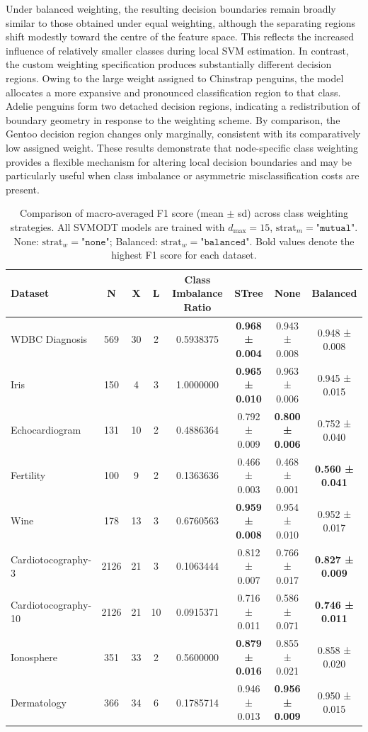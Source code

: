 Under balanced weighting, the resulting decision boundaries remain broadly similar to those obtained under equal weighting, although the separating regions shift modestly toward the centre of the feature space. This reflects the increased influence of relatively smaller classes during local SVM estimation. In contrast, the custom weighting specification produces substantially different decision regions. Owing to the large weight assigned to Chinstrap penguins, the model allocates a more expansive and pronounced classification region to that class. Adelie penguins form two detached decision regions, indicating a redistribution of boundary geometry in response to the weighting scheme. By comparison, the Gentoo decision region changes only marginally, consistent with its comparatively low assigned weight. These results demonstrate that node-specific class weighting provides a flexible mechanism for altering local decision boundaries and may be particularly useful when class imbalance or asymmetric misclassification costs are present.

\begin{table}
\centering
\caption{\label{tab:svmodt-class-weight-f1-score-table-latex}Comparison of macro-averaged F1 score (mean \(\pm\) sd) across class weighting strategies. All SVMODT models are trained with \(d_{\max}=15\), \(\mathrm{strat}_{m}=\texttt{"mutual"}\). None: \(\mathrm{strat}_{w}=\texttt{"none"}\); Balanced: \(\mathrm{strat}_{w}=\texttt{"balanced"}\). Bold values denote the highest F1 score for each dataset.}
\centering
\fontsize{8}{10}\selectfont
\begin{tabular}[t]{l|c|c|c|c|c|c|c}
\hline
Dataset & N & X & L & Class Imbalance Ratio & STree & None & Balanced\\
\hline
WDBC Diagnosis & 569 & 30 & 2 & 0.5938375 & \textbf{0.968 ± 0.004} & 0.943 ± 0.008 & 0.948 ± 0.008\\
\hline
Iris & 150 & 4 & 3 & 1.0000000 & \textbf{0.965 ± 0.010} & 0.963 ± 0.006 & 0.945 ± 0.015\\
\hline
Echocardiogram & 131 & 10 & 2 & 0.4886364 & 0.792 ± 0.009 & \textbf{0.800 ± 0.006} & 0.752 ± 0.040\\
\hline
Fertility & 100 & 9 & 2 & 0.1363636 & 0.466 ± 0.003 & 0.468 ± 0.001 & \textbf{0.560 ± 0.041}\\
\hline
Wine & 178 & 13 & 3 & 0.6760563 & \textbf{0.959 ± 0.008} & 0.954 ± 0.010 & 0.952 ± 0.017\\
\hline
Cardiotocography-3 & 2126 & 21 & 3 & 0.1063444 & 0.812 ± 0.007 & 0.766 ± 0.017 & \textbf{0.827 ± 0.009}\\
\hline
Cardiotocography-10 & 2126 & 21 & 10 & 0.0915371 & 0.716 ± 0.011 & 0.586 ± 0.071 & \textbf{0.746 ± 0.011}\\
\hline
Ionosphere & 351 & 33 & 2 & 0.5600000 & \textbf{0.879 ± 0.016} & 0.855 ± 0.021 & 0.858 ± 0.020\\
\hline
Dermatology & 366 & 34 & 6 & 0.1785714 & 0.946 ± 0.013 & \textbf{0.956 ± 0.009} & 0.950 ± 0.015\\
\hline
\end{tabular}
\end{table}

